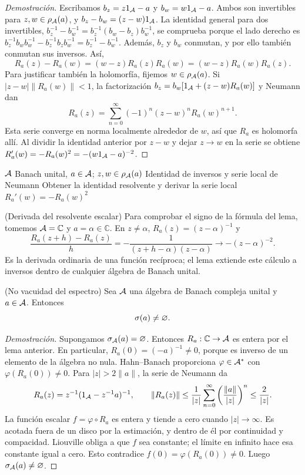 \begin{proof}[Demostración]
Escribamos $b_z=z1_\mathcal A-a$ y $b_w=w1_\mathcal A-a$. Ambos son invertibles
para $z,w\in\rho_\mathcal A(a)$, y $b_z-b_w=(z-w)1_\mathcal A$.
La identidad general para dos invertibles,
$b_z^{-1}-b_w^{-1}=b_z^{-1}(b_w-b_z)b_w^{-1}$,
se comprueba porque el lado derecho es
$b_z^{-1}b_wb_w^{-1}-b_z^{-1}b_zb_w^{-1}
=b_z^{-1}-b_w^{-1}$. Además, $b_z$
y $b_w$ conmutan, y por ello también conmutan sus inversos. Así,
\[
 R_a(z)-R_a(w)=(w-z)R_a(z)R_a(w)
                =(w-z)R_a(w)R_a(z).
\]
Para justificar también la holomorfía, fijemos $w\in\rho_\mathcal A(a)$.
Si $|z-w|\|R_a(w)\|<1$, la factorización
$b_z=b_w[1_\mathcal A+(z-w)R_a(w)]$ y Neumann dan
\[
 R_a(z)=\sum_{n=0}^{\infty}(-1)^n(z-w)^nR_a(w)^{n+1}.
\]
Esta serie converge en norma localmente alrededor de $w$, así que $R_a$
es holomorfa allí. Al dividir la identidad anterior por $z-w$ y dejar
$z\to w$ en la serie se obtiene
$R_a'(w)=-R_a(w)^2=-(w1_\mathcal A-a)^{-2}$.
\end{proof}

\proofdiagram
{$\mathcal A$ Banach unital, $a\in\mathcal A$; $z,w\in\rho_\mathcal A(a)$}
{Identidad de inversos y serie local de Neumann}
{Obtener la identidad resolvente y derivar la serie local}
{$R_a'(w)=-R_a(w)^2$}

\begin{cthejemplo}{(Derivada del resolvente escalar)}
Para comprobar el signo de la fórmula del lema, tomemos
$\mathcal A=\mathbb C$ y $a=\alpha\in\mathbb C$.
En $z\ne\alpha$, $R_a(z)=(z-\alpha)^{-1}$ y
\[
 \frac{R_a(z+h)-R_a(z)}{h}
 =-\frac{1}{(z+h-\alpha)(z-\alpha)}
 \longrightarrow -(z-\alpha)^{-2}.
\]
Es la derivada ordinaria de una función recíproca; el lema extiende
este cálculo a inversos dentro de cualquier álgebra de Banach unital.
\end{cthejemplo}

\begin{cthteorema}{(No vacuidad del espectro)}
Sea $\mathcal A$ una álgebra de Banach compleja unital y $a\in\mathcal A$. Entonces
\[
 \sigma(a)\neq\varnothing.
\]
\end{cthteorema}

\begin{proof}[Demostración]
Supongamos $\sigma_\mathcal A(a)=\varnothing$. Entonces
$R_a:\mathbb C\to\mathcal A$ es entera por el lema anterior. En particular,
$R_a(0)=(-a)^{-1}\ne0$, porque es inverso de un elemento de la
álgebra no nula. Hahn--Banach proporciona
$\varphi\in\mathcal A^*$ con $\varphi(R_a(0))\ne0$.
Para $|z|>2\|a\|$, la serie de Neumann da
\[
 R_a(z)=z^{-1}(1_\mathcal A-z^{-1}a)^{-1},\qquad
 \|R_a(z)\|\le\frac{1}{|z|}
 \sum_{n=0}^{\infty}\left(\frac{\|a\|}{|z|}\right)^n
 \le\frac{2}{|z|}.
\]
La función escalar $f=\varphi\circ R_a$ es entera y tiende a cero
cuando $|z|\to\infty$. Es acotada fuera de un disco por la estimación,
y dentro de él por continuidad y compacidad. Liouville obliga a que
$f$ sea constante; el límite en infinito hace esa constante igual a cero.
Esto contradice $f(0)=\varphi(R_a(0))\ne0$. Luego
$\sigma_\mathcal A(a)\ne\varnothing$.
\end{proof}


